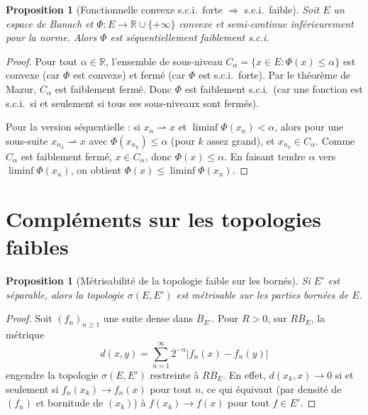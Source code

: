\documentclass[a4paper,12pt]{book}
\newcommand{\R}{\mathbb{R}}
\newcommand{\abs}[1]{\left| #1 \right|}
\newcommand{\weakto}{\rightharpoonup}
\theoremstyle{definition}
\theoremstyle{plain}
\newtheorem{proposition}[definition]{Proposition}
\theoremstyle{remark}
\begin{document}
\begin{proposition}[Fonctionnelle convexe s.c.i.\ forte $\Rightarrow$ s.c.i.\ faible]
\label{prop:convexe-sci-forte-faible}
Soit $E$ un espace de Banach et $\Phi : E \to \R \cup \{+\infty\}$ convexe et
semi-continue inférieurement pour la norme. Alors $\Phi$ est séquentiellement
faiblement s.c.i.
\end{proposition}

\begin{proof}
Pour tout $\alpha \in \R$, l'ensemble de sous-niveau
$C_\alpha = \{x \in E : \Phi(x) \le \alpha\}$ est convexe (car $\Phi$ est convexe)
et fermé (car $\Phi$ est s.c.i.\ forte). Par le théorème de Mazur,
$C_\alpha$ est faiblement fermé. Donc $\Phi$ est faiblement s.c.i.\ (car une fonction
est s.c.i.\ si et seulement si tous ses sous-niveaux sont fermés).

Pour la version séquentielle : si $x_n \weakto x$ et $\liminf \Phi(x_n) < \alpha$,
alors pour une sous-suite $x_{n_k} \weakto x$ avec $\Phi(x_{n_k}) \le \alpha$
(pour $k$ assez grand), et $x_{n_k} \in C_\alpha$. Comme $C_\alpha$ est faiblement
fermé, $x \in C_\alpha$, donc $\Phi(x) \le \alpha$. En faisant tendre $\alpha$
vers $\liminf \Phi(x_n)$, on obtient $\Phi(x) \le \liminf \Phi(x_n)$.
\end{proof}


\section{Compléments sur les topologies faibles}
\label{sec:complements-faibles}

\begin{proposition}[Métrisabilité de la topologie faible sur les bornés]
\label{prop:metrisabilite-faible-borne}
Si $E'$ est séparable, alors la topologie $\sigma(E,E')$ est métrisable sur les
parties bornées de $E$.
\end{proposition}

\begin{proof}
Soit $(f_n)_{n \ge 1}$ une suite dense dans $\overline{B}_{E'}$. Pour $R > 0$,
sur $R \overline{B}_E$, la métrique
\[
  d(x,y) = \sum_{n=1}^{\infty} 2^{-n} \abs{f_n(x) - f_n(y)}
\]
engendre la topologie $\sigma(E,E')$ restreinte à $R \overline{B}_E$.
En effet, $d(x_k, x) \to 0$ si et seulement si $f_n(x_k) \to f_n(x)$ pour tout $n$,
ce qui équivaut (par densité de $(f_n)$ et bornitude de $(x_k)$) à $f(x_k) \to f(x)$
pour tout $f \in E'$.
\end{proof}
\end{document}
